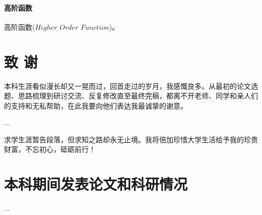 \documentclass[openany,oneside]{book}
\theoremstyle{definition}
\theoremstyle{definition}
\begin{document}
	\subsubsection{高阶函数}
	高阶函数($Higher$ $Order$ $Function$)。
	

\clearpage
{}
{}

\chapter*{致 \qquad 谢}
\thispagestyle{empty}
本科生涯看似漫长却又一晃而过，回首走过的岁月，我感慨良多。从最初的论文选题、思路梳理到研讨交流、反复修改直至最终完稿，都离不开老师、同学和亲人们的支持和无私帮助，在此我要向他们表达我最诚挚的谢意。


...

求学生涯暂告段落，但求知之路却永无止境。我将倍加珍惜大学生活给予我的珍贵财富，不忘初心，砥砺前行！
\chapter*{本科期间发表论文和科研情况}
\thispagestyle{empty}

...
\end{document}
